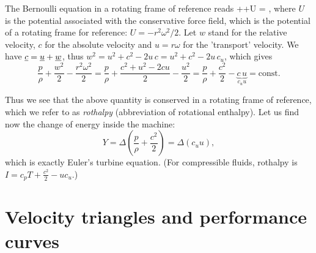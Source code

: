 The Bernoulli equation in a rotating frame of reference reads
%
\beq
{}++U = ,
\eeq
%
where $U$ is the potential associated with the conservative force field, which is the potential of a rotating frame for reference: $U=-r^2\omega^2/2$. Let $w$ stand for the relative velocity, $c$ for the absolute velocity and $u=r \omega$ for the 'transport' velocity. We have $\underline{c}=\underline{u}+\underline{w}$, thus $w^2=u^2+c^2-2u\,c=u^2+c^2-2u\,c_u$, which gives
\begin{equation}
\frac{p}{\rho}+\frac{w^2}{2}-\frac{r^2 \omega^2}{2}=\frac{p}{\rho}+\frac{c^2+u^2-2c u}{2}-\frac{u^2}{2}=\frac{p}{\rho}+\frac{c^2}{2}-\underbrace{c\,u}_{c_u u}=\mathrm{const}.
\end{equation}

Thus we see that the above quantity is conserved in a rotating frame of reference, which we refer to as \emph{rothalpy} (abbreviation of rotational enthalpy). Let us find now the change of energy inside the machine:
%
\begin{equation}
Y=\Delta \left(\frac{p}{\rho}+\frac{c^2}{2}\right)=\Delta \left( c_u u\right),
\end{equation}
%
which is exactly Euler's turbine equation. (For compressible fluids, rothalpy is $I=c_p T+\frac{c^2}{2}-u c_{u}$.)

\section{Velocity triangles and performance curves} \label{sec:velocity_triangles_pumps}


